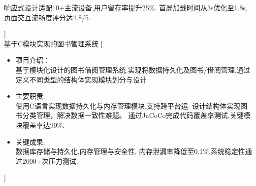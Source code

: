 \documentclass[zh]{resume}
\begin{document}
\begin{experiences}
\begin{itemize}
    响应式设计适配10+主流设备,用户留存率提升25\%.
    首屏加载时间从3s优化至1.8s,页面交互流畅度评分达4.8/5.
  \end{itemize}]
  \\
  {基于C模块实现的图书管理系统}%
  [\begin{itemize}
    \item 项目介绍：\\
    基于模块化设计的图书借阅管理系统.实现将数据持久化及图书/借阅管理.通过定义不同类型的结构体实现模块划分与设计
    \item 主要职责: \\
    使用C语言实现数据持久化与内存管理模块,支持跨平台运.  
    设计结构体实现图书分类管理，解决数据一致性难题。  
    通过JaCoCo完成代码覆盖率测试,关键模块覆盖率达90\%.
    \item 关键成果: \\
    数据库存储与持久化,内存管理与安全性.
    内存泄漏率降低至0.1\%,系统稳定性通过2000+次压力测试.
  \end{itemize}]

\end{experiences}
\end{document}

